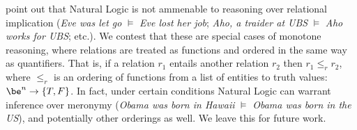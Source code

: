  point out that Natural Logic is
  not ammenable to reasoning over relational implication
  (\textit{Eve was let go} $\models$ \textit{Eve lost her job};
   \textit{Aho, a traider at UBS} $\models$ \textit{Aho works for UBS};
   etc.).
We contest that these are special cases of monotone reasoning, where
  relations are treated as functions and ordered in the same way as
  quantifiers.
That is, if a relation $r_1$ entails another relation $r_2$ then
  $r_1 \leq_r r_2$, where $\leq_r$ is an ordering of functions from
  a list of entities to truth values: $\be^n \rightarrow \{T,F\}$.
In fact, under certain conditions Natural Logic can warrant inference
  over meronymy
  (\textit{Obama was born in Hawaii} $\models$ \textit{Obama was born in the US}),
  and potentially other orderings as well.
We leave this for future work.


